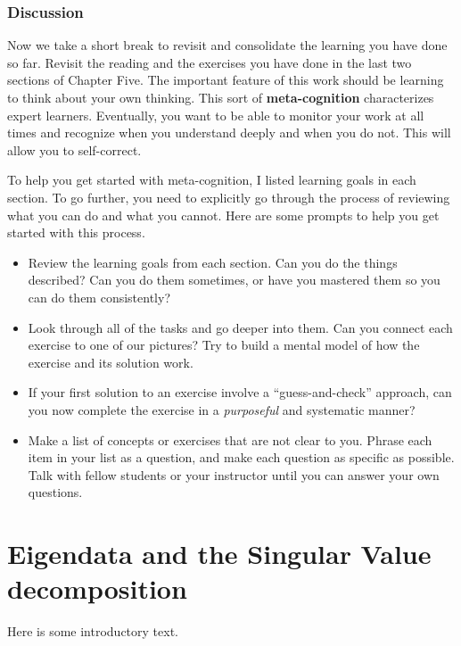 \documentclass[10pt,]{book}
\newcommand{\terminology}[1]{\textbf{#1}}
\theoremstyle{plain}
\theoremstyle{definition}
\numberwithin{equation}{section}
\begin{document}
\subsection[Discussion]{Discussion}\label{subsection-125}
Now we take a short break to revisit and consolidate the learning you
      have done so far. Revisit the reading and the exercises you have done in
      the last two sections of Chapter Five. The important feature of this work should be
      learning to think about your own thinking. This sort of \terminology{meta-cognition}
      characterizes expert learners. Eventually, you want to be able to monitor
      your work at all times and recognize when you understand deeply and when
      you do not. This will allow you to self-correct.
\par
To help you get started with meta-cognition, I listed learning goals in
      each section. To go further, you need to explicitly go through the process
      of reviewing what you can do and what you cannot. Here are some prompts to
      help you get started with this process.
      \begin{itemize}
\item{}
          Review the learning goals from each section. Can you do the things
          described? Can you do them sometimes, or have you mastered them so you
          can do them consistently?
        \item{}
          Look through all of the tasks and go deeper into them. Can you
          connect each exercise to one of our pictures? Try to build a mental
          model of how the exercise and its solution work.
        \item{}
          If your first solution to an exercise involve a ``guess-and-check''
          approach, can you now complete the exercise in a \emph{purposeful}
          and systematic manner?
        \item{}
          Make a list of concepts or exercises that are not clear to you. Phrase
          each item in your list as a question, and make each question as
          specific as possible. Talk with fellow students or your
          instructor until you can answer your own questions.
        \end{itemize}

\clearpage
\typeout{************************************************}
\typeout{************************************************}
\chapter[Eigendata and the Singular Value decomposition]{Eigendata and the Singular Value decomposition}\label{chapter-eigendata-and-svd}
Here is some introductory text.\appendix
\backmatter
\end{document}
